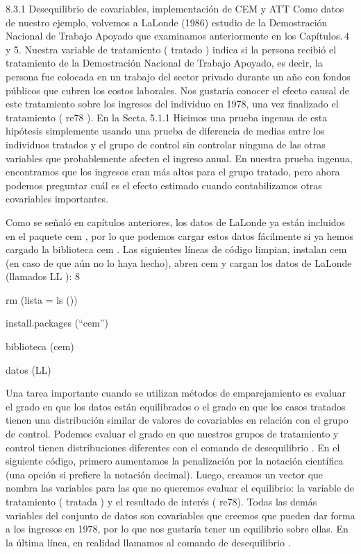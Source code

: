 \documentclass[
]{book}
\begin{document}
8.3.1 Desequilibrio de covariables, implementación de CEM y ATT
Como datos de nuestro ejemplo, volvemos a LaLonde (1986) estudio de la Demostración Nacional de Trabajo Apoyado que examinamos anteriormente en los Capítulos. 4 y 5. Nuestra variable de tratamiento ( tratado ) indica si la persona recibió el tratamiento de la Demostración Nacional de Trabajo Apoyado, es decir, la persona fue colocada en un trabajo del sector privado durante un año con fondos públicos que cubren los costos laborales. Nos gustaría conocer el efecto causal de este tratamiento sobre los ingresos del individuo en 1978, una vez finalizado el tratamiento ( re78 ). En la Secta. 5.1.1 Hicimos una prueba ingenua de esta hipótesis simplemente usando una prueba de diferencia de medias entre los individuos tratados y el grupo de control sin controlar ninguna de las otras variables que probablemente afecten el ingreso anual. En nuestra prueba ingenua, encontramos que los ingresos eran más altos para el grupo tratado, pero ahora podemos preguntar cuál es el efecto estimado cuando contabilizamos otras covariables importantes.

Como se señaló en capítulos anteriores, los datos de LaLonde ya están incluidos en el paquete cem , por lo que podemos cargar estos datos fácilmente si ya hemos cargado la biblioteca cem . Las siguientes líneas de código limpian, instalan cem (en caso de que aún no lo haya hecho), abren cem y cargan los datos de LaLonde (llamados LL ): 8

rm (lista = ls ())

install.packages (``cem'')

biblioteca (cem)

datos (LL)

Una tarea importante cuando se utilizan métodos de emparejamiento es evaluar el grado en que los datos están equilibrados o el grado en que los casos tratados tienen una distribución similar de valores de covariables en relación con el grupo de control. Podemos evaluar el grado en que nuestros grupos de tratamiento y control tienen distribuciones diferentes con el comando de desequilibrio . En el siguiente código, primero aumentamos la penalización por la notación científica (una opción si prefiere la notación decimal). Luego, creamos un vector que nombra las variables para las que no queremos evaluar el equilibrio: la variable de tratamiento ( tratada ) y el resultado de interés ( re78). Todas las demás variables del conjunto de datos son covariables que creemos que pueden dar forma a los ingresos en 1978, por lo que nos gustaría tener un equilibrio sobre ellas. En la última línea, en realidad llamamos al comando de desequilibrio .
\end{document}
